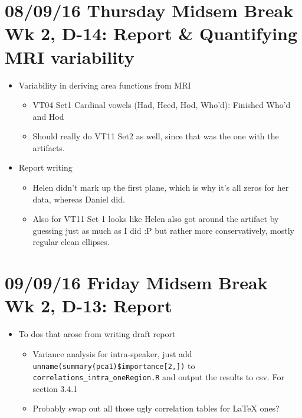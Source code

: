 \documentclass{article}
\begin{document}
\section*{08/09/16 Thursday Midsem Break Wk 2, D-14: Report \& Quantifying MRI variability}
\begin{itemize}
    \item Variability in deriving area functions from MRI
    \begin{itemize}
        \item VT04 Set1 Cardinal vowels (Had, Heed, Hod, Who'd): Finished Who'd and Hod
        \item Should really do VT11 Set2 as well, since that was the one with the artifacts.
    \end{itemize}
    \item Report writing
    \begin{itemize}
        \item Helen didn't mark up the first plane, which is why it's all zeros for her data, whereas Daniel did. 
        \item Also for VT11 Set 1 looks like Helen also got around the artifact by guessing just as much as I did :P but rather more conservatively, mostly regular clean ellipses.
    \end{itemize}
\end{itemize}

\section*{09/09/16 Friday Midsem Break Wk 2, D-13: Report}
\begin{itemize}
    \item To dos that arose from writing draft report
    \begin{itemize}
        \item Variance analysis for intra-speaker, just add \verb|unname(summary(pca1)$importance[2,])| to \verb|correlations_intra_oneRegion.R| and output the results to csv. For section 3.4.1
        \item Probably swap out all those ugly correlation tables for LaTeX ones?
    \end{itemize}
\end{itemize}
\end{document}

